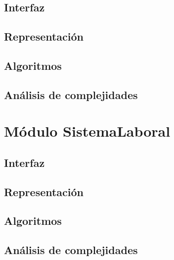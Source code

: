 \documentclass[12pt, a4paper]{article}
\begin{document}
\subsection{Interfaz}

\subsection{Representaci\'on}

\subsection{Algoritmos}

\subsection{Análisis de complejidades}

\newpage

\section{Módulo SistemaLaboral} 
\subsection{Interfaz}

\subsection{Representaci\'on}

\subsection{Algoritmos}

\subsection{Análisis de complejidades}

\newpage

% 
% 
% 
% 
\newpage
\end{document}
